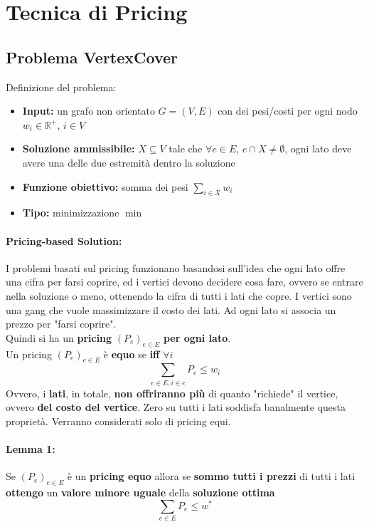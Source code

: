 
\section{Tecnica di Pricing}

\subsection{Problema VertexCover}

Definizione del problema: 
\begin{itemize}
	\item \textbf{Input:} un grafo non orientato $G =(V,E)$ con dei pesi/costi per ogni nodo $w_i \in \mathbb{R}^+$, $i \in V$
	\item \textbf{Soluzione ammissibile:} $X \subseteq V$ tale che $\forall e \in E$, $e \cap X \neq \emptyset$, ogni lato deve avere una delle due estremità dentro la soluzione
	\item \textbf{Funzione obiettivo:} somma dei pesi $\sum_{i \in X} w_i$
	\item \textbf{Tipo:} minimizzazione $\min$
\end{itemize}

\paragraph{Pricing-based Solution:} I problemi basati sul pricing funzionano basandosi sull'idea che ogni lato offre una cifra per farsi coprire, ed i vertici devono decidere cosa fare, ovvero se entrare nella soluzione o meno, ottenendo la cifra di tutti i lati che copre. I vertici sono una gang che vuole massimizzare il costo dei lati. Ad ogni lato si associa un prezzo per "farsi coprire".\\
Quindi si ha un \textbf{pricing} $(P_e)_{e \in E}$ \textbf{per ogni lato}.\\

Un pricing $(P_e)_{e \in E}$ è \textbf{equo} se \textbf{iff} $\forall i$
$$ \sum_{e \in E, i \in e} P_e \leq w_i $$
Ovvero, i \textbf{lati}, in totale, \textbf{non offriranno più} di quanto "richiede" il vertice, ovvero \textbf{del costo del vertice}. Zero su tutti i lati soddisfa banalmente questa proprietà. Verranno considerati solo di pricing equi.\\

\newpage

\paragraph{Lemma 1:} Se $(P_e)_{e \in E}$ è un \textbf{pricing equo} allora se \textbf{sommo tutti i prezzi} di tutti i lati \textbf{ottengo} un \textbf{valore minore uguale} della \textbf{soluzione ottima}
$$ \sum_{e \in E} P_e \leq w^\ast $$

